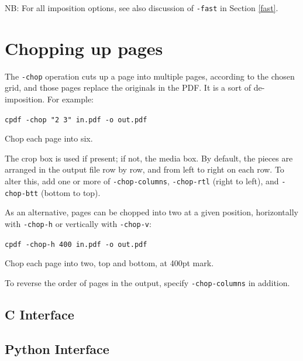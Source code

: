 \documentclass{book}
\begin{document}
\noindent NB: For all imposition options, see also discussion of \texttt{-fast} in Section \ref{fast}.

\section{Chopping up pages}


The \texttt{-chop} operation cuts up a page into multiple pages, according to the chosen grid, and those pages replace the originals in the PDF. It is a sort of de-imposition. For example:

  \begin{framed}
    \noindent\small\verb!cpdf -chop "2 3" in.pdf -o out.pdf!
 
    \vspace{2.5mm}
    \noindent Chop each page into six.
  \end{framed}

\noindent The crop box is used if present; if not, the media box. By default, the pieces are arranged in the output file row by row, and from left to right on each row. To alter this, add one or more of \texttt{-chop-columns}, \texttt{-chop-rtl} (right to left), and \texttt{-chop-btt} (bottom to top).

As an alternative, pages can be chopped into two at a given position, horizontally with \texttt{-chop-h} or vertically with \texttt{-chop-v}:

  \begin{framed}
    \noindent\small\verb!cpdf -chop-h 400 in.pdf -o out.pdf!
 
    \vspace{2.5mm}
    \noindent Chop each page into two, top and bottom, at 400pt mark.
  \end{framed}

\noindent To reverse the order of pages in the output, specify \texttt{-chop-columns} in addition.

\begin{cpdflib}
\clearpage
\section*{C Interface}
\begin{small}\tt

\end{small}
\end{cpdflib}

\begin{pycpdflib}
\clearpage
\section*{Python Interface}
\begin{small}\tt

\end{small}
\end{pycpdflib}
\end{document}
